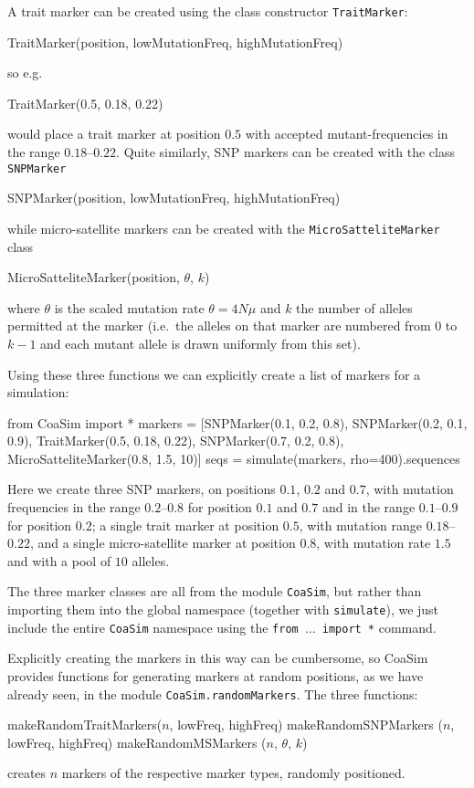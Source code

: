 \documentclass{manual}
\begin{document}
\begin{empfile}
A trait marker can be created using the class constructor
\texttt{TraitMarker}:
\begin{code}
TraitMarker(position, lowMutationFreq, highMutationFreq)
\end{code}
so e.g.\
\begin{code}
TraitMarker(0.5, 0.18, 0.22)
\end{code}
would place a trait marker at position $0.5$ with accepted
mutant-frequencies in the range $0.18$--$0.22$.  Quite similarly, SNP
markers can be created with the class \texttt{SNPMarker}
\begin{code}
SNPMarker(position, lowMutationFreq, highMutationFreq)
\end{code}
while micro-satellite markers can be created with the
\texttt{MicroSatteliteMarker} class
\begin{code}
MicroSatteliteMarker(position, $\theta$, $k$)
\end{code}
where $\theta$ is the scaled mutation rate $\theta=4N\mu$ and $k$ the
number of alleles permitted at the marker (i.e.\ the alleles on that
marker are numbered from $0$ to $k-1$ and each mutant allele is drawn
uniformly from this set).

Using these three functions we can explicitly create a list of markers
for a simulation:
\begin{code}
from CoaSim import *
markers = [SNPMarker(0.1, 0.2, 0.8),
           SNPMarker(0.2, 0.1, 0.9),
           TraitMarker(0.5, 0.18, 0.22),
           SNPMarker(0.7, 0.2, 0.8),
           MicroSatteliteMarker(0.8, 1.5, 10)]
seqs = simulate(markers, rho=400).sequences
\end{code}

\noindent
Here we create three SNP markers, on positions $0.1$, $0.2$ and $0.7$,
with mutation frequencies in the range $0.2$--$0.8$ for position
$0.1$ and $0.7$ and in the range $0.1$--$0.9$ for position $0.2$; a
single trait marker at position $0.5$, with mutation range
$0.18$--$0.22$, and a single micro-satellite marker at position $0.8$,
with mutation rate $1.5$ and with a pool of $10$ alleles.

The three marker classes are all from the module \texttt{CoaSim}, but
rather than importing them into the global namespace (together with
\texttt{simulate}), we just include the entire \texttt{CoaSim}
namespace using the \texttt{from $\ldots$ import *} command.

Explicitly creating the markers in this way can be cumbersome, so
CoaSim provides functions for generating markers at random positions, as we have
already seen, in the module \texttt{CoaSim.randomMarkers}.  The three
functions:
\begin{code}
makeRandomTraitMarkers($n$, lowFreq, highFreq)
makeRandomSNPMarkers  ($n$, lowFreq, highFreq)
makeRandomMSMarkers   ($n$, $\theta$, $k$)
\end{code}
creates $n$ markers of the respective marker types, randomly
positioned.


\end{empfile}
\end{document}
